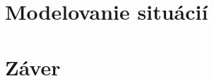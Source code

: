 \documentclass[10pt,oneside,slovak,a4paper]{article}
\begin{document}
\section{Modelovanie situácií} \label{modelovanie}

\section{Záver} \label{zaver} 



\end{document}
